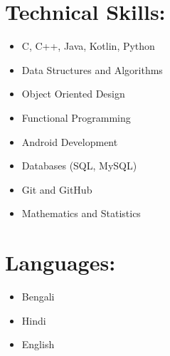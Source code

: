 \documentclass[a4paper, 11pt]{article}
\begin{document}
\begin{tcolorbox}
\begin{minipage}[t]{8cm}
\begin{tcolorbox}[grow to left by=0.6cm, colback=leftcol, colframe=leftcol]
                \section*{Technical Skills:}
                    \begin{itemize}
                        \item C, C++, Java, Kotlin, Python
                        \item Data Structures and Algorithms
                        \item Object Oriented Design
                        \item Functional Programming
                        \item Android Development
                        \item Databases (SQL, MySQL)
                        \item Git and GitHub
                        \item Mathematics and Statistics
                    \end{itemize}
    
                \section*{Languages:}
                    \begin{itemize}
                        \item Bengali
                        \item Hindi
                        \item English
                    \end{itemize}
                    
            \end{tcolorbox}
        \end{minipage}%
        \begin{minipage}[t]{10cm}
            \raggedleft
            \vspace*{-0.5cm}
            \begin{tcolorbox}[grow to right by=0.5cm, colframe=white, colback=white]
    

\end{tcolorbox}
\end{minipage}
\end{tcolorbox}
\end{document}
